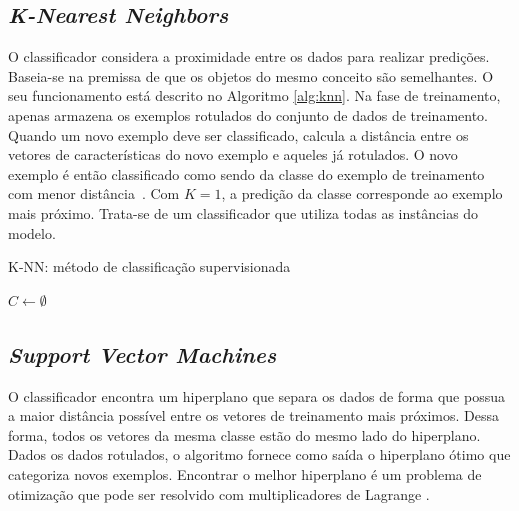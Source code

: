 \subsection{\textit{K-Nearest Neighbors}}
\label{sec:knn}

O classificador  considera a proximidade entre os dados para realizar predições. Baseia-se na premissa de que os objetos do mesmo conceito são semelhantes. O seu funcionamento está descrito no Algoritmo \ref{alg:knn}. Na fase de treinamento, apenas armazena os exemplos rotulados do conjunto de dados de treinamento. Quando um novo exemplo deve ser classificado, calcula a distância entre os vetores de características do novo exemplo e aqueles já rotulados. O novo exemplo é então classificado como sendo da classe do exemplo de treinamento com menor distância~\cite{Boiman2008}. Com $K = 1$, a predição da classe corresponde ao exemplo mais próximo. Trata-se de um classificador que utiliza todas as instâncias do modelo.

\begin{algorithm}[!htbp]
  \caption{K-NN: método de classificação supervisionada}
  \label{alg:knn}
  \SetAlgoLined
  $C \gets \emptyset $\;
\end{algorithm}


\subsection{\textit{Support Vector Machines}}
\label{sec:svm}

O classificador  encontra um hiperplano que separa os dados de forma que possua a maior distância possível entre os vetores de treinamento mais próximos. Dessa forma, todos os vetores da mesma classe estão do mesmo lado do hiperplano. Dados os dados rotulados, o algoritmo fornece como saída o hiperplano ótimo que categoriza novos exemplos. Encontrar o melhor hiperplano é um problema de otimização que pode ser resolvido com multiplicadores de Lagrange \cite{Chapelle1999a}.

